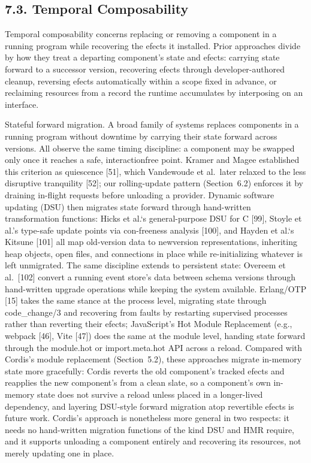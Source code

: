 \documentclass[
  10
]{article}
\newcounter{none} %
\begin{document}
\subsection{7.3. Temporal Composability}\label{temporal-composability-1}

Temporal composability concerns replacing or removing a component in a
running program while recovering the efects it installed. Prior
approaches divide by how they treat a departing component's state and
efects: carrying state forward to a successor version, recovering efects
through developer-authored cleanup, reversing efects automatically
within a scope fixed in advance, or reclaiming resources from a record
the runtime accumulates by interposing on an interface.

Stateful forward migration. A broad family of systems replaces
components in a running program without downtime by carrying their state
forward across versions. All observe the same timing discipline: a
component may be swapped only once it reaches a safe, interactionfree
point. Kramer and Magee established this criterion as quiescence
{[}51{]}, which Vandewoude et al.~later relaxed to the less disruptive
tranquility {[}52{]}; our rolling-update pattern (Section~6.2) enforces
it by draining in-flight requests before unloading a provider. Dynamic
software updating (DSU) then migrates state forward through hand-written
transformation functions: Hicks et al.`s general-purpose DSU for C
{[}99{]}, Stoyle et al.'s type-safe update points via con-freeness
analysis {[}100{]}, and Hayden et al.`s Kitsune {[}101{]} all map
old-version data to newversion representations, inheriting heap objects,
open files, and connections in place while re-initializing whatever is
left unmigrated. The same discipline extends to persistent state:
Overeem et al.~{[}102{]} convert a running event store's data between
schema versions through hand-written upgrade operations while keeping
the system available. Erlang/OTP {[}15{]} takes the same stance at the
process level, migrating state through code\_change/3 and recovering
from faults by restarting supervised processes rather than reverting
their efects; JavaScript's Hot Module Replacement (e.g., webpack
{[}46{]}, Vite {[}47{]}) does the same at the module level, handing
state forward through the module.hot or import.meta.hot API across a
reload. Compared with Cordis's module replacement (Section~5.2), these
approaches migrate in-memory state more gracefully: Cordis reverts the
old component's tracked efects and reapplies the new component's from a
clean slate, so a component's own in-memory state does not survive a
reload unless placed in a longer-lived dependency, and layering
DSU-style forward migration atop revertible efects is future work.
Cordis's approach is nonetheless more general in two respects: it needs
no hand-written migration functions of the kind DSU and HMR require, and
it supports unloading a component entirely and recovering its resources,
not merely updating one in place.
\end{document}

